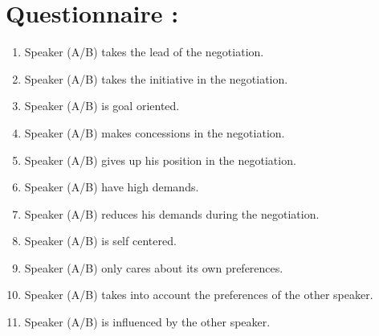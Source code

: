 \documentclass{article}
\begin{document}
	\section{Questionnaire :}
		\begin{enumerate}
			\item Speaker (A/B) takes the lead of the negotiation.
			\item Speaker (A/B) takes the initiative in the negotiation. 
			\item Speaker (A/B) is goal oriented.
			\item Speaker (A/B) makes concessions in the negotiation.
			\item Speaker (A/B) gives up his position in the negotiation.
			\item Speaker (A/B) have high demands.
			\item Speaker (A/B) reduces his demands during the negotiation.
			\item Speaker (A/B) is self centered.
			\item Speaker (A/B) only cares about its own preferences.
			\item Speaker (A/B) takes into account the preferences of the other speaker. 
			\item Speaker (A/B) is influenced by the other speaker.
			
		\end{enumerate}
	
\end{document}
